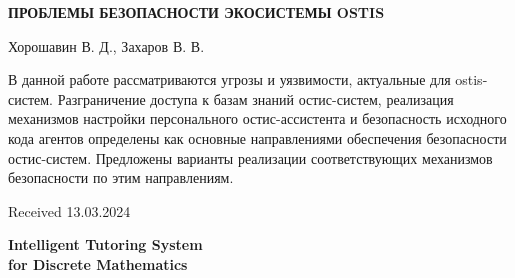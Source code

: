 \documentclass{article}
\begin{document}
\begin{multicols}{2}
\columnbreak

\raggedcolumns

\begin{center} 
\renewcommand{\baselinestretch}{1.0}
\normalsize
\textbf{ПРОБЛЕМЫ БЕЗОПАСНОСТИ
ЭКОСИСТЕМЫ OSTIS}
\end{center}
\begin{center}
\normalsize
    Хорошавин В. Д., Захаров В. В.
\end{center}

\footnotesize В данной работе рассматриваются угрозы и уязвимости,
актуальные для ostis-систем. Разграничение доступа к базам
знаний остис-систем, реализация механизмов настройки
персонального остис-ассистента и безопасность исходного
кода агентов определены как основные направлениями обеспечения безопасности остис-систем. Предложены варианты
реализации соответствующих механизмов безопасности по
этим направлениям.


\begin{flushright}
    Received 13.03.2024
\end{flushright}

\end{multicols}

\newpage
\begin{center}
\Huge
    \textbf{Intelligent Tutoring System\\
for Discrete Mathematics}\\
\end{center}
\begin{center}
\small
{}\\
\end{center}
\end{document}
